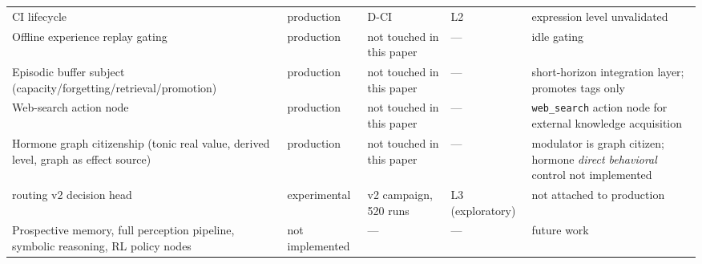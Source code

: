 \documentclass[10pt,a4paper]{article}
\begin{document}
\begin{table}[t]
\begin{tabular}{L{3.6cm}L{1.9cm}L{1.9cm}L{1.4cm}L{3.9cm}}
CI lifecycle & production & D-CI & L2 & expression level unvalidated \\
Offline experience replay gating & production & not touched in this paper & --- & idle gating \\
Episodic buffer subject (capacity/forgetting/retrieval/promotion) & production & not touched in this paper & --- & short-horizon integration layer; promotes tags only \\
Web-search action node & production & not touched in this paper & --- & \texttt{web\_search} action node for external knowledge acquisition \\
Hormone graph citizenship (tonic real value, derived level, graph as effect source) & production & not touched in this paper & --- & modulator is graph citizen; hormone \emph{direct behavioral} control not implemented \\
routing v2 decision head & experimental & v2 campaign, 520 runs & L3 (exploratory) & not attached to production \\
Prospective memory, full perception pipeline, symbolic reasoning, RL policy nodes & not implemented & --- & --- & future work \\
\bottomrule
\end{tabular}
\end{table}
\end{document}
